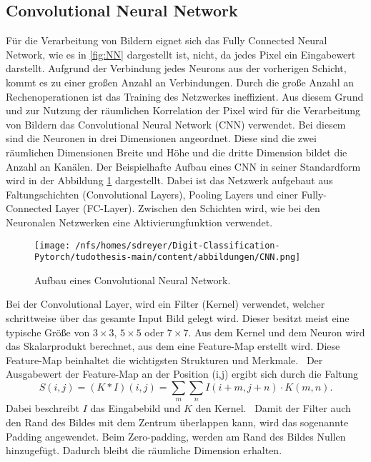 \subsection{Convolutional Neural Network}\label{sec:NN}
Für die Verarbeitung von Bildern eignet sich das Fully Connected Neural Network, wie es in \ref{fig:NN} dargestellt ist, nicht, da jedes Pixel ein Eingabewert darstellt.
Aufgrund der Verbindung jedes Neurons aus der vorherigen Schicht, kommt es zu einer großen Anzahl an Verbindungen.
Durch die große Anzahl an Rechenoperationen ist das Training des Netzwerkes ineffizient.
Aus diesem Grund und zur Nutzung der räumlichen Korrelation der Pixel wird für die Verarbeitung von Bildern das Convolutional Neural Network (CNN) verwendet.
Bei diesem sind die Neuronen in drei Dimensionen angeordnet.
Diese sind die zwei räumlichen Dimensionen Breite und Höhe und die dritte Dimension bildet die Anzahl an Kanälen.
Der Beispielhafte Aufbau eines CNN in seiner Standardform wird in der Abbildung \ref{fig:CNN} dargestellt.
Dabei ist das Netzwerk aufgebaut aus Faltungschichten (Convolutional Layers), Pooling Layers und einer Fully-Connected Layer (FC-Layer).
Zwischen den Schichten wird, wie bei den Neuronalen Netzwerken eine Aktivierungfunktion verwendet.~\cite{OShea} 
\begin{figure}[H]
  \centering
  \texttt{[image: /nfs/homes/sdreyer/Digit-Classification-Pytorch/tudothesis-main/content/abbildungen/CNN.png]}
  \caption{Aufbau eines Convolutional Neural Network.~\cite{Mohammed2024}}
  \label{fig:CNN}
\end{figure}
Bei der Convolutional Layer, wird ein Filter (Kernel) verwendet, welcher schrittweise über das gesamte Input Bild gelegt wird.
Dieser besitzt meist eine typische Größe von $3 \times 3$, $5 \times 5$ oder $ 7 \times 7$.  
Aus dem Kernel und dem Neuron wird das Skalarprodukt berechnet, aus dem eine Feature-Map erstellt wird. 
Diese Feature-Map beinhaltet die wichtigsten Strukturen und Merkmale.~\cite{Yamashita2018}
Der Ausgabewert der Feature-Map an der Position (i,j) ergibt sich durch die Faltung
\begin{equation}
  S(i,j) = (K * I)(i, j) = \sum_m \sum_n I(i + m, j + n) \cdot K(m,n).
\end{equation}
Dabei beschreibt $I$ das Eingabebild und $K$ den Kernel.~\cite{Goodfellow-et-al-2016}
Damit der Filter auch den Rand des Bildes mit dem Zentrum überlappen kann, wird das sogenannte Padding angewendet.
Beim Zero-padding, werden am Rand des Bildes Nullen hinzugefügt. Dadurch bleibt die räumliche Dimension erhalten.
